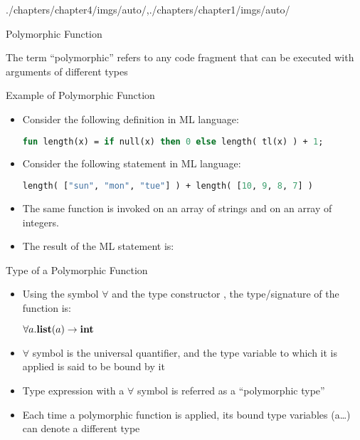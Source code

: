 \begin{graphicspathcontext}{{./chapters/chapter4/imgs/auto/},{./chapters/chapter1/imgs/auto/}}
\begin{bibunit}[apalike]
\begin{frame}{Polymorphic Function}
	\begin{definition}
			The term ``polymorphic'' refers to any code fragment that can be executed with arguments of different types
	\end{definition}
	\vspace{1cm}
\end{frame}

\begin{frame}[background=8,fragile]{Example of Polymorphic Function}
	\begin{itemize}
	\item Consider the following definition in ML language:
		\begin{lstlisting}[language=ml]
fun length(x) = if null(x) then 0 else length( tl(x) ) + 1;
		\end{lstlisting}
	\vfill
	\item Consider the following statement in ML language:
		\begin{lstlisting}[language=ml]
length( ["sun", "mon", "tue"] ) + length( [10, 9, 8, 7] )
		\end{lstlisting}
	\vfill
	\item The same function  is invoked on an array of strings and on an array of integers.
	\vfill
	\item The result of the ML statement is: 
	\end{itemize}
\end{frame}

\begin{frame}[background=9]{Type of a Polymorphic Function}
	\begin{itemize}
	\item Using the symbol $\forall$ and the type constructor , the type/signature of the function  is:
		\begin{center}
			$\forall a.{\textbf{list}}(a) \rightarrow {\textbf{int}}$
		\end{center}
	\vspace{.5cm}
	\item $\forall$ symbol is the universal quantifier, and the type variable to which it is applied is said to be bound by it
	\item Type expression with a $\forall$ symbol is referred as a ``polymorphic type''
	\vspace{.5cm}
	\item Each time a polymorphic function is applied, its bound type variables (a\dots) can denote a different type
	\end{itemize}
\end{frame}


\end{bibunit}
\end{graphicspathcontext}
